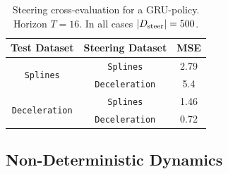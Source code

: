 \documentclass[nohyperref]{article}
\begin{document}
\begin{table}[]
    \centering
    \caption{
    Evaluation of \methodname\ with a GRU policy on variable Steering Dataset size. $T=16$.
    Note that $|\steeringbuffer|=0$ represents the case where no steering is used at all. In this case, we use trajectories sampled from a random policy to initialize $|\prevbuffer|$ (see Algorithm~\ref{alg:ESI}). Note: Since we do not normalize the MSE w.r.t. $T$, these results have a different scale than Table~\ref{table:MSEs}. }
    \label{table:GRU_steering}
\end{table}

\begin{table}[]
    \centering
    \caption{Steering cross-evaluation for a GRU-policy. Horizon $T=16$. In all cases $|D_{\mathrm{steer}}|=500$.}
    \label{table:GRU_ood}
    \begin{tabular}{ccc}
        \toprule
        Test Dataset & Steering Dataset & MSE \\
        \midrule
        \multirow{2}{*}{\texttt{Splines}}      & \texttt{Splines}      & 2.79  \\
                                               & \texttt{Deceleration} & 5.4 \\
        \midrule
        \multirow{2}{*}{\texttt{Deceleration}} & \texttt{Splines}      & 1.46  \\
                                               & \texttt{Deceleration} & 0.72  \\
        \bottomrule
    \end{tabular}
\end{table}

\subsection{Non-Deterministic Dynamics}
\label{app:non_deterministic_dynamics}
\end{document}
